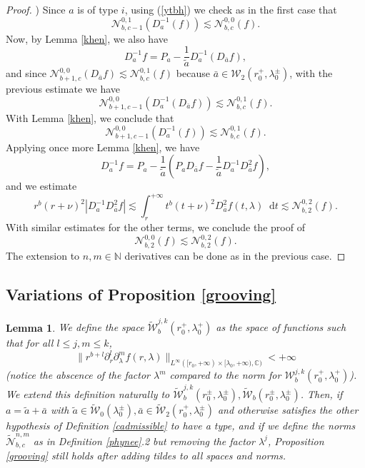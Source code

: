 \documentclass[11 pt]{amsart}
\newtheorem{lem}{Lemma}[section]
\theoremstyle{definition}
\theoremstyle{remark}
\numberwithin{equation}{section}
\newcommand{\dd}{\mathop{}\!\mathrm{d}}
\begin{document}
\begin{proof}
\medskip
{}) Since $a$ is of type $i$, using (\ref{ytbh}) we check as in the first
  case that
  \[ \mathcal{N}_{b, c - 1}^{0, 1} (D_a^{- 1} (f)) \lesssim \mathcal{N}_{b,
     c}^{0, 0} (f) . \]
  Now, by Lemma \ref{khen}, we also have
  \[ D_a^{- 1} f = P_a - \frac{1}{\widetilde{a}} D_a^{- 1} (D_{\bar{a}} f), \]
  and since $\mathcal{N}_{b + 1, c}^{0, 0} (D_{\bar{a}} f) \lesssim \mathcal{N}_{b,
  c}^{0, 1} (f)$ because $\bar{a} \in
  \mathcal{W}_{2} (r_0^+, \lambda_0^{\pm})$, with the previous estimate we have
  \[ \mathcal{N}_{b + 1, c - 1}^{0, 0} (D_a^{- 1} (D_{\bar{a}} f)) \lesssim
     \mathcal{N}_{b, c}^{0, 1} (f) . \]
  With Lemma \ref{khen}, we conclude that
  \[ \mathcal{N}_{b + 1, c - 1}^{0, 0} (D_a^{- 1} (f)) \lesssim
     \mathcal{N}_{b, c}^{0, 1} (f) . \]
Applying once more Lemma \ref{khen}, we have
\[ D_a^{- 1} f = P_a - \frac{1}{\widetilde{a}}(P_aD_{\bar{a}} f -\frac{1}{\widetilde{a}}  D_a^{- 1} D_{\bar{a}}^2 f  ),  \]
and we estimate
\[ r^b(r+\nu)^2 | D_a^{- 1}D_{\bar{a}}^2 f | \lesssim \int_r^{+\infty} t^b(t+\nu)^2 D_{\bar{a}}^2 f(t,\lambda)\dd t \lesssim 
 \mathcal{N}_{b, 2}^{0, 2}(f).\]
With similar estimates for the other terms, we conclude the proof of
\[ \mathcal{N}_{b, 2}^{0, 0}(f) \lesssim \mathcal{N}_{b, 2}^{0, 2}(f). \]
  The extension to $n, m \in \mathbb{N}$ derivatives can be done as in the
  previous case.
\end{proof}

\subsection{Variations of Proposition \ref{grooving}}

\begin{lem} \label{amaru}
  We define the space $\widetilde{\mathcal{W}}_b^{j, k} (r_0^+, \lambda_0^+)$ as
  the space of functions such that for all $l \leqslant j, m \leqslant k$,
  \[ \| r^{b + l} \partial_r^l \partial_{\lambda}^m f (r, \lambda)
     \|_{L^{\infty} ([r_0, + \infty) \times [\lambda_0, + \infty),
     \mathbb{C})} < + \infty \]
  (notice the abscence of the factor $\lambda^m$ compared to the norm for
  $\mathcal{W}_b^{j, k} (r_0^+, \lambda_0^+)$). We extend this definition
  naturally to $\widetilde{\mathcal{W}}_b^{j, k} (r_0^{\pm}, \lambda_0^{\pm}),
  \widetilde{\mathcal{W}}_b (r_0^{\pm}, \lambda_0^{\pm})$. Then, if $a = \widetilde{a}
  + \bar{a}$ with $\widetilde{a} \in \widetilde{\mathcal{W}}_0 (\lambda_0^{\pm}),
  \bar{a} \in \widetilde{\mathcal{W}}_2 (r_0^+, \lambda_0^{\pm})$ and otherwise
  satisfies the other hypothesis of Definition \ref{cadmissible} to have a
  type, and if we define the norms $\widetilde{\mathcal{N}}_{b, c}^{n, m}$ as in
  Definition \ref{phynee}.2 but removing the factor $\lambda^j$, Proposition
  \ref{grooving} still holds after adding tildes to all spaces and norms.
\end{lem}
\end{document}

